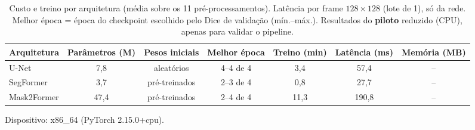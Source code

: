 \begin{table}[t]\centering\scriptsize
\caption{Custo e treino por arquitetura (média sobre os 11 pré-processamentos). Latência por frame $128\times128$ (lote de 1), só da rede. Melhor época = época do checkpoint escolhido pelo Dice de validação (mín.--máx.). Resultados do \textbf{piloto} reduzido (CPU), apenas para validar o pipeline.}\label{tab:custo}
\begin{tabular}{lcccccc}
\toprule
Arquitetura & Parâmetros (M) & Pesos iniciais & Melhor época & Treino (min) & Latência (ms) & Memória (MB) \\
\midrule
U-Net & 7,8 & aleatórios & 4--4 de 4 & 3,4 & 57,4 & -- \\
SegFormer & 3,7 & pré-treinados & 2--3 de 4 & 0,8 & 27,7 & -- \\
Mask2Former & 47,4 & pré-treinados & 2--4 de 4 & 11,3 & 190,8 & -- \\
\bottomrule
\end{tabular}
\par\smallskip Dispositivo: x86\_64 (PyTorch 2.15.0+cpu).
\end{table}
